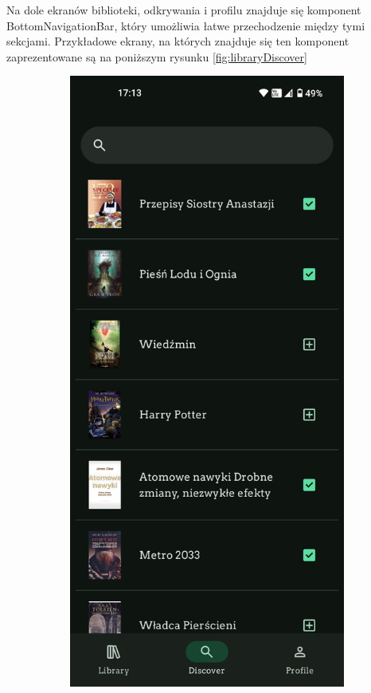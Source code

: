 \documentclass[12pt,twoside]{article}
\begin{document}
Na dole ekranów biblioteki, odkrywania i profilu znajduje się komponent BottomNavigationBar, który umożliwia 
łatwe przechodzenie między tymi sekcjami. Przykładowe ekrany, na których znajduje się ten komponent 
zaprezentowane są na poniższym rysunku \ref{fig:libraryDiscover}
\begin{figure}[ht]
    \centering
    \begin{subfigure}[b]{0.48\textwidth}
        \includegraphics[width=\textwidth]{figures/discover.png}

\end{subfigure}
\end{figure}
\end{document}
